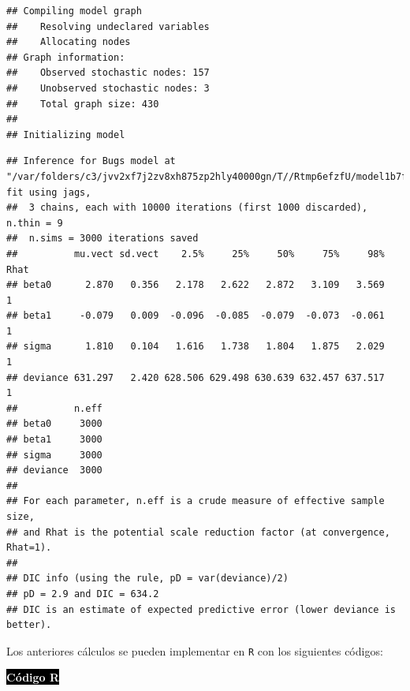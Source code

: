 \begin{Eje}
\begin{knitrout}
\begin{kframe}
\begin{alltt}
 \hlkwb{<-} \hlstd{(} 
                          \hlstd{=}\hlstd{,} \hlstd{=}\hlstd{,}
\end{alltt}
\begin{verbatim}
## Compiling model graph
##    Resolving undeclared variables
##    Allocating nodes
## Graph information:
##    Observed stochastic nodes: 157
##    Unobserved stochastic nodes: 3
##    Total graph size: 430
## 
## Initializing model
\end{verbatim}
\begin{alltt}
\end{alltt}
\begin{verbatim}
## Inference for Bugs model at "/var/folders/c3/jvv2xf7j2zv8xh875zp2hly40000gn/T//Rtmp6efzfU/model1b7f345f1c00.txt", fit using jags,
##  3 chains, each with 10000 iterations (first 1000 discarded), n.thin = 9
##  n.sims = 3000 iterations saved
##          mu.vect sd.vect    2.5%     25%     50%     75%     98% Rhat
## beta0      2.870   0.356   2.178   2.622   2.872   3.109   3.569    1
## beta1     -0.079   0.009  -0.096  -0.085  -0.079  -0.073  -0.061    1
## sigma      1.810   0.104   1.616   1.738   1.804   1.875   2.029    1
## deviance 631.297   2.420 628.506 629.498 630.639 632.457 637.517    1
##          n.eff
## beta0     3000
## beta1     3000
## sigma     3000
## deviance  3000
## 
## For each parameter, n.eff is a crude measure of effective sample size,
## and Rhat is the potential scale reduction factor (at convergence, Rhat=1).
## 
## DIC info (using the rule, pD = var(deviance)/2)
## pD = 2.9 and DIC = 634.2
## DIC is an estimate of expected predictive error (lower deviance is better).
\end{verbatim}
\end{kframe}
\end{knitrout}
Los anteriores cálculos se pueden implementar en \verb'R' con los siguientes códigos:

\colorbox{black}{\textcolor{white}{\textbf{Código R}}}
\begin{knitrout}
\color{fgcolor}\begin{kframe}
\begin{alltt}
\end{alltt}



\end{kframe}
\end{knitrout}
\end{Eje}
